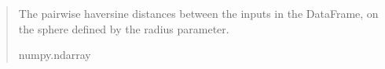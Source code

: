 \documentclass[letterpaper,10pt,english]{sphinxmanual}
\begin{document}
\begin{fulllineitems}
\begin{quote}
\begin{description}
\begin{itemize}
\end{itemize}

\sphinxAtStartPar
{} \textendash{} The pairwise haversine distances between the inputs in the DataFrame,
on the sphere defined by the radius parameter.

\sphinxAtStartPar
numpy.ndarray

\end{description}\end{quote}

\end{fulllineitems}

\end{document}
